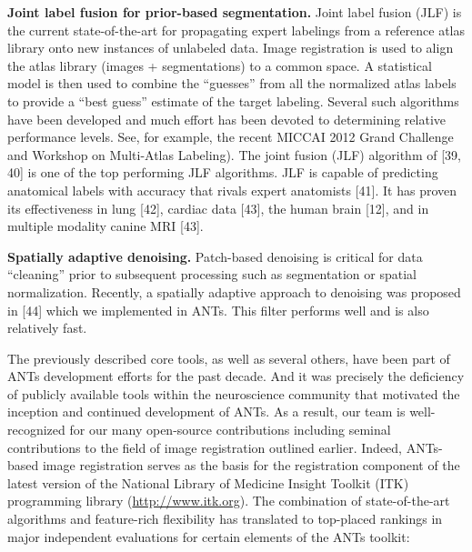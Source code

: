 \documentclass[11pt,]{article}
\begin{document}
\textbf{Joint label fusion for prior-based segmentation.} Joint label
fusion (JLF) is the current state-of-the-art for propagating expert
labelings from a reference atlas library onto new instances of unlabeled
data. Image registration is used to align the atlas library (images +
segmentations) to a common space. A statistical model is then used to
combine the ``guesses'' from all the normalized atlas labels to provide
a ``best guess'' estimate of the target labeling. Several such
algorithms have been developed and much effort has been devoted to
determining relative performance levels. See, for example, the recent
MICCAI 2012 Grand Challenge and Workshop on Multi-Atlas Labeling). The
joint fusion (JLF) algorithm of {[}39, 40{]} is one of the top
performing JLF algorithms. JLF is capable of predicting anatomical
labels with accuracy that rivals expert anatomists {[}41{]}. It has
proven its effectiveness in lung {[}42{]}, cardiac data {[}43{]}, the
human brain {[}12{]}, and in multiple modality canine MRI {[}43{]}.

\textbf{Spatially adaptive denoising.} Patch-based denoising is critical
for data ``cleaning'' prior to subsequent processing such as
segmentation or spatial normalization. Recently, a spatially adaptive
approach to denoising was proposed in {[}44{]} which we implemented in
ANTs. This filter performs well and is also relatively fast.

The previously described core tools, as well as several others, have
been part of ANTs development efforts for the past decade. And it was
precisely the deficiency of publicly available tools within the
neuroscience community that motivated the inception and continued
development of ANTs. As a result, our team is well-recognized for our
many open-source contributions including seminal contributions to the
field of image registration outlined earlier. Indeed, ANTs-based image
registration serves as the basis for the registration component of the
latest version of the National Library of Medicine Insight Toolkit (ITK)
programming library (\url{http://www.itk.org}). The combination of
state-of-the-art algorithms and feature-rich flexibility has translated
to top-placed rankings in major independent evaluations for certain
elements of the ANTs toolkit:
\end{document}

